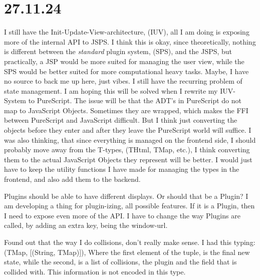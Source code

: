 \section{27.11.24}

I still have the Init-Update-View-architecture, (IUV), all I am doing is
exposing more of the internal API to JSPS. I think this is okay, since
theoretically, nothing is different between the \textit{standard} plugin system,
(SPS), and the JSPS, but practically, a JSP would be more suited for managing
the user view, while the SPS would be better suited for more computational heavy
tasks. Maybe, I have no source to back me up here, just vibes. I still have the
recurring problem of state management. I am hoping this will be solved when I
rewrite my IUV-System to PureScript. The issue will be that the ADT's in
PureScript do not map to JavaScript Objects. Sometimes they are wrapped, which
makes the FFI between PureScript and JavaScript difficult. But I think just
converting the objects before they enter and after they leave the PureScript
world will suffice. I was also thinking, that since everything is managed on
the frontend side, I should probably move away from the T-types, (THtml, TMap,
etc.), I think converting them to the actual JavaScript Objects they represent
will be better. I would just have to keep the utility functions I have made for
managing the types in the frontend, and also add them to the backend.

Plugins should be able to have different displays. Or should that be a Plugin?
I am developing a thing for plugin-izing, all possible features. If it is a
Plugin, then I need to expose even more of the API. I have to change the way
Plugins are called, by adding an extra key, being the window-url.

Found out that the way I do collisions, don't really make sense. I had this
typing: (TMap, [(String, TMap)]), Where the first element of the tuple, is the
final new state, while the second, is a list of collisions, the plugin and the
field that is collided with. This information is not encoded in this type.
